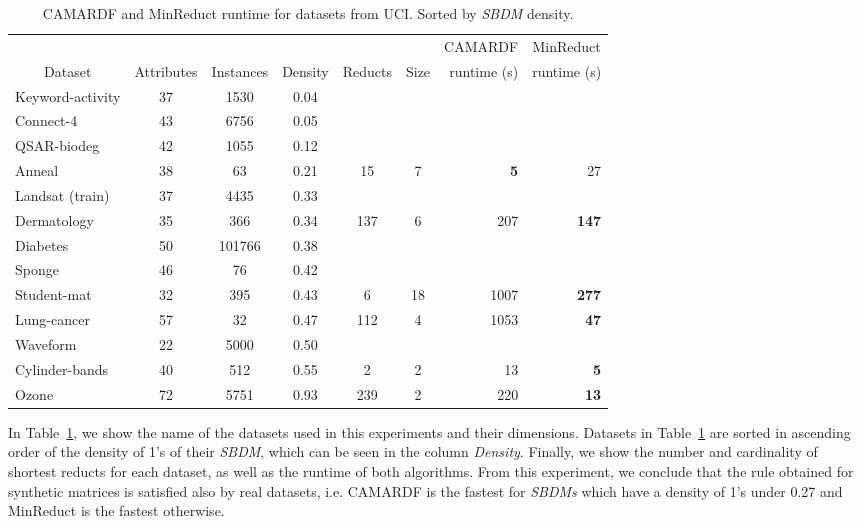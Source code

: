 \documentclass[authoryear,11pt]{elsarticle}
\begin{document}
	\begin{table}[htb]
		\centering
		\caption{CAMARDF and MinReduct runtime for datasets from UCI. Sorted by \textit{SBDM} density.}
		\label{tab:density}
		\begin{tabular}{|l|c|c|c|c|c|r|r|}
			\hline
			&&&&&& \multicolumn{1}{c|}{CAMARDF} & \multicolumn{1}{c|}{MinReduct}  \\
			\multicolumn{1}{|c|}{Dataset}       & Attributes & Instances & Density & Reducts & Size & runtime (s)  & runtime (s)  \\
			\hline
			Keyword-activity          & 37 & 1530   & 0.04    & & & &   \\
			Connect-4                 & 43 & 6756   & 0.05    & & & &    \\
			QSAR-biodeg               & 42 & 1055   & 0.12    & & & &  \\
			Anneal                    & 38 & 63     & 0.21    & 15  & 7  & \textbf{5} & 27 \\
			Landsat (train)           & 37 & 4435   & 0.33    & & & &   \\
			Dermatology               & 35 & 366    & 0.34    & 137 & 6  & 207        & \textbf{147}   \\
			Diabetes                  & 50 & 101766 & 0.38    & & & &   \\
			Sponge                    & 46 & 76     & 0.42    & & & & \\
			Student-mat               & 32 & 395    & 0.43    & 6   & 18 & 1007       & \textbf{277}  \\
			Lung-cancer               & 57 & 32     & 0.47    & 112 & 4  & 1053       & \textbf{47}   \\
			Waveform                  & 22 & 5000   & 0.50    & & & &  \\
			Cylinder-bands            & 40 & 512    & 0.55    & 2   & 2  & 13         & \textbf{5}   \\
			Ozone                     & 72 & 5751   & 0.93    & 239 & 2  & 220        & \textbf{13}   \\
			\hline
		\end{tabular}
	\end{table}   
			
  In Table~\ref{tab:density}, we show the name of the datasets used in this experiments and their dimensions. Datasets in Table~\ref{tab:density} are sorted in ascending order of the density of 1's of their \textit{SBDM}, which can be seen in the column \textit{Density}. Finally, we show the number and cardinality of shortest reducts for each dataset, as well as the runtime of both algorithms. From this experiment, we conclude that the rule obtained for synthetic matrices is satisfied also by real datasets, i.e. CAMARDF is the fastest for \textit{SBDMs} which have a density of 1's under 0.27 and MinReduct is the fastest otherwise.
  
\end{document}
